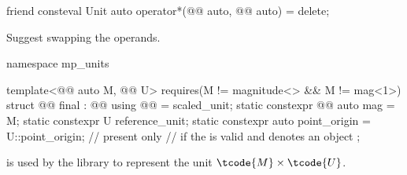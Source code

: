 \begin{itemdecl}
friend consteval Unit auto operator*(@@ auto, @@ auto) = delete;
\end{itemdecl}

\begin{itemdescr}
\pnum
\recommended
Suggest swapping the operands.
\end{itemdescr}

\begin{codeblock}
namespace mp_units {

template<@@ auto M, @@ U>
  requires(M != magnitude<>{} && M != mag<1>)
struct @@ final : @@ {
  using @@ = scaled_unit;
  static constexpr @@ auto mag = M;
  static constexpr U reference_unit{};
  static constexpr auto point_origin = U::point_origin;  // present only
    // if the   is valid and denotes an object
};

}
\end{codeblock}

\pnum
{} is used by the library
to represent the unit $\tcode{M} \times \tcode{U}$.

